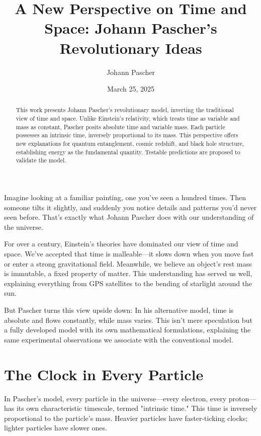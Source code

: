 \documentclass[a4paper,12pt]{article}
\title{A New Perspective on Time and Space: Johann Pascher’s Revolutionary Ideas}
\author{Johann Pascher}
\date{March 25, 2025}
\begin{document}
	
	\maketitle
	
	\begin{abstract}
		This work presents Johann Pascher’s revolutionary model, inverting the traditional view of time and space. Unlike Einstein’s relativity, which treats time as variable and mass as constant, Pascher posits absolute time and variable mass. Each particle possesses an intrinsic time, inversely proportional to its mass. This perspective offers new explanations for quantum entanglement, cosmic redshift, and black hole structure, establishing energy as the fundamental quantity. Testable predictions are proposed to validate the model.
	\end{abstract}
	
	\tableofcontents
	\newpage
	
	Imagine looking at a familiar painting, one you’ve seen a hundred times. Then someone tilts it slightly, and suddenly you notice details and patterns you’d never seen before. That’s exactly what Johann Pascher does with our understanding of the universe.
	
	For over a century, Einstein’s theories have dominated our view of time and space. We’ve accepted that time is malleable—it slows down when you move fast or enter a strong gravitational field. Meanwhile, we believe an object’s rest mass is immutable, a fixed property of matter. This understanding has served us well, explaining everything from GPS satellites to the bending of starlight around the sun.
	
	But Pascher turns this view upside down: In his alternative model, time is absolute and flows constantly, while mass varies. This isn’t mere speculation but a fully developed model with its own mathematical formulations, explaining the same experimental observations we associate with the conventional model.
	
	\section{The Clock in Every Particle}
	In Pascher’s model, every particle in the universe—every electron, every proton—has its own characteristic timescale, termed "intrinsic time." This time is inversely proportional to the particle’s mass. Heavier particles have faster-ticking clocks; lighter particles have slower ones.
	
\end{document}
